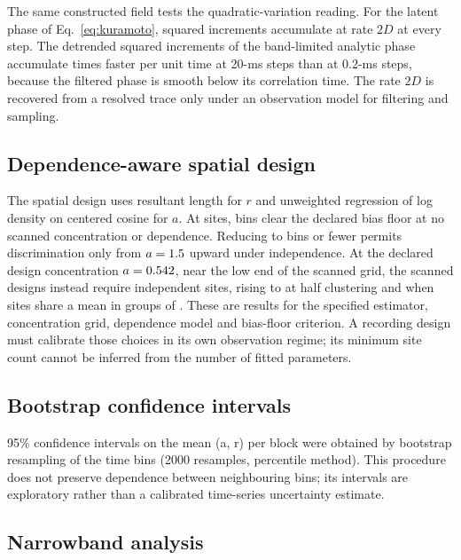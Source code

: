 \documentclass{article}
\begin{document}
The same constructed field tests the quadratic-variation reading. For the latent phase of Eq.~\eqref{eq:kuramoto}, squared increments accumulate at rate $2D$ at every step. The detrended squared increments of the band-limited analytic phase accumulate \eegCheckQvRatio{} times faster per unit time at 20-ms steps than at 0.2-ms steps, because the filtered phase is smooth below its correlation time. The rate $2D$ is recovered from a resolved trace only under an observation model for filtering and sampling.

\subsection{Dependence-aware spatial design}
\label{sec:supp-density-design}

The spatial design uses resultant length for $r$ and unweighted regression of log density on centered cosine for $a$. At \designProtocolSites{} sites, \designPublishedBins{} bins clear the declared bias floor at no scanned concentration or dependence. Reducing to \designUsableBins{} bins or fewer permits discrimination only from $a=1.5$ upward under independence. At the declared design concentration $a=0.542$, near the low end of the scanned grid, the scanned designs instead require \designSitesIndependent{} independent sites, rising to \designSitesHalfClustered{} at half clustering and \designSitesClustered{} when sites share a mean in groups of \designSitesPerCluster. These are results for the specified estimator, concentration grid, dependence model and bias-floor criterion. A recording design must calibrate those choices in its own observation regime; its minimum site count cannot be inferred from the number of fitted parameters.

\subsection{Bootstrap confidence intervals}

95\% confidence intervals on the mean (a, r) per block were obtained by bootstrap resampling of the time bins (2000 resamples, percentile method). This procedure does not preserve dependence between neighbouring bins; its intervals are exploratory rather than a calibrated time-series uncertainty estimate.

\subsection{Narrowband analysis}
\end{document}
